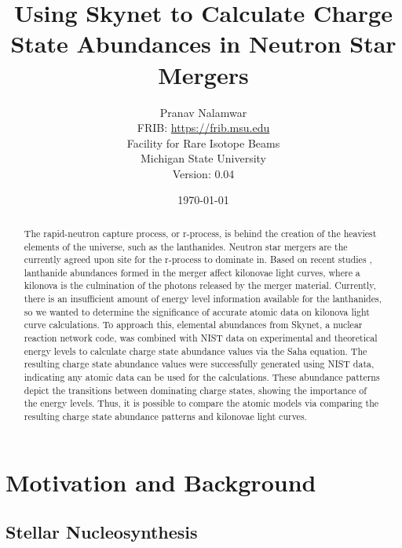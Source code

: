 \documentclass[11pt,a4paper]{article}
\begin{document}

\title{Using Skynet to Calculate Charge State Abundances in Neutron Star Mergers}

\author{Pranav Nalamwar\\FRIB: \protect\url{https://frib.msu.edu}\\Facility for Rare Isotope Beams\\Michigan State University\\Version: 0.04} 
\date{\today}
\maketitle

\begin{abstract}

\noindent The rapid-neutron capture process, or r-process, is behind the creation of the heaviest elements of the universe, such as the lanthanides. Neutron star mergers are the currently agreed upon site for the r-process to dominate in. Based on recent studies \cite{Kasen_Metzger_Barnes_2017} , lanthanide abundances formed in the merger affect kilonovae light curves, where a kilonova is the culmination of the photons released by the merger material. Currently, there is an insufficient amount of energy level information available for the lanthanides, so we wanted to determine the significance of accurate atomic data on kilonova light curve calculations. To approach this, elemental abundances from Skynet, a nuclear reaction network code, was combined with NIST data on experimental and theoretical energy levels to calculate charge state abundance values via the Saha equation. The resulting charge state abundance values were successfully generated using NIST data, indicating any atomic data can be used for the calculations. These abundance patterns depict the transitions between dominating charge states, showing the importance of the energy levels. Thus, it is possible to compare the atomic models via comparing the resulting charge state abundance patterns and kilonovae light curves. 

\end{abstract}

\tableofcontents

\section{Motivation and Background}

\subsection{Stellar Nucleosynthesis}
\end{document}
